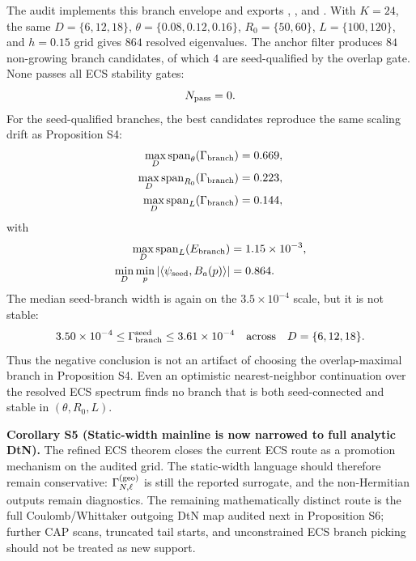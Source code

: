 \documentclass[aps,prd,onecolumn,notitlepage,nofootinbib,superscriptaddress,11pt,floatfix]{revtex4-2}
\begin{document}
The audit  implements this branch envelope and exports , , and .
With \(K=24\), the same \(D=\{6,12,18\}\), \(\theta=\{0.08,0.12,0.16\}\), \(R_0=\{50,60\}\), \(L=\{100,120\}\), and \(h=0.15\) grid gives \(864\) resolved eigenvalues.  The anchor filter produces \(84\) non-growing branch candidates, of which \(4\) are seed-qualified by the overlap gate.  None passes all ECS stability gates:
\[
N_{\rm pass}=0 .
\]
For the seed-qualified branches, the best candidates reproduce the same scaling drift as Proposition S4:
\[
\begin{aligned}
\max_D{\rm span}_\theta(\Gamma_{\rm branch})&=0.669,\\
\max_D{\rm span}_{R_0}(\Gamma_{\rm branch})&=0.223,\\
\max_D{\rm span}_{L}(\Gamma_{\rm branch})&=0.144,
\end{aligned}
\]
with
\[
\begin{aligned}
\max_D{\rm span}_{L}(E_{\rm branch})&=1.15\times10^{-3},\\
\min_D \min_p |\langle\psi_{\rm seed},B_a(p)\rangle|&=0.864 .
\end{aligned}
\]
The median seed-branch width is again on the \(3.5\times10^{-4}\) scale, but it is not stable:
\[
3.50\times10^{-4}\leq \Gamma_{\rm branch}^{\rm seed}\leq 3.61\times10^{-4}
\quad{\rm across}\quad D=\{6,12,18\}.
\]
Thus the negative conclusion is not an artifact of choosing the overlap-maximal branch in Proposition S4.  Even an optimistic nearest-neighbor continuation over the resolved ECS spectrum finds no branch that is both seed-connected and stable in \((\theta,R_0,L)\).

\medskip\noindent\textbf{Corollary S5 (Static-width mainline is now narrowed to full analytic DtN).}
The refined ECS theorem closes the current ECS route as a promotion mechanism on the audited grid.  The static-width language should therefore remain conservative: \(\Gamma_{N,\ell}^{\rm(geo)}\) is still the reported surrogate, and the non-Hermitian outputs remain diagnostics.  The remaining mathematically distinct route is the full Coulomb/Whittaker outgoing DtN map audited next in Proposition S6; further CAP scans, truncated tail starts, and unconstrained ECS branch picking should not be treated as new support.
\end{document}

